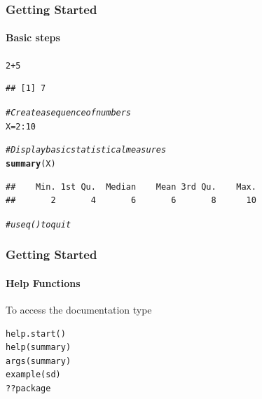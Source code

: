 \documentclass[12pt]{beamer}\usepackage[]{graphicx}\usepackage[]{color}
\makeatletter
\newcommand{\hlnum}[1]{\textcolor[rgb]{0.686,0.059,0.569}{#1}}%
\newcommand{\hlcom}[1]{\textcolor[rgb]{0.678,0.584,0.686}{\textit{#1}}}%
\newcommand{\hlopt}[1]{\textcolor[rgb]{0,0,0}{#1}}%
\newcommand{\hlstd}[1]{\textcolor[rgb]{0.345,0.345,0.345}{#1}}%
\newcommand{\hlkwb}[1]{\textcolor[rgb]{0.69,0.353,0.396}{#1}}%
\newcommand{\hlkwd}[1]{\textcolor[rgb]{0.737,0.353,0.396}{\textbf{#1}}}%
\newenvironment{kframe}{%
 \def\at@end@of@kframe{}%
 \ifinner\ifhmode%
  \def\at@end@of@kframe{\end{minipage}}%
  \begin{minipage}{\columnwidth}%
 \fi\fi%
 \def\FrameCommand##1{\hskip\@totalleftmargin \hskip-\fboxsep
 \colorbox{shadecolor}{##1}\hskip-\fboxsep
     \hskip-\linewidth \hskip-\@totalleftmargin \hskip\columnwidth}%
 \MakeFramed {\advance\hsize-\width
   \@totalleftmargin\z@ \linewidth\hsize
   \@setminipage}}%
 {\par\unskip\endMakeFramed%
 \at@end@of@kframe}
\newenvironment{knitrout}{}{} %
\makeatother
\begin{document}
\begin{frame}[fragile]
  \frametitle{Getting Started}
  \framesubtitle{Basic steps}

\begin{knitrout}
\color{fgcolor}\begin{kframe}
\begin{alltt}
\hlnum{2}\hlopt{+}\hlnum{5}
\end{alltt}
\begin{verbatim}
## [1] 7
\end{verbatim}
\begin{alltt}
\hlcom{# Create a sequence of numbers}
\hlstd{X} \hlkwb{=} \hlnum{2}\hlopt{:}\hlnum{10}

\hlcom{# Display basic statistical measures}
\hlkwd{summary}\hlstd{(X)}
\end{alltt}
\begin{verbatim}
##    Min. 1st Qu.  Median    Mean 3rd Qu.    Max. 
##       2       4       6       6       8      10
\end{verbatim}
\begin{alltt}
\hlcom{# use q() to quit}
\end{alltt}
\end{kframe}
\end{knitrout}
\clearpage
\end{frame}

\begin{frame}[fragile]
  \frametitle{Getting Started}
  \framesubtitle{Help Functions}
\begin{block}{To access the documentation type}
\end{block}
\begin{lstlisting} 
help.start()
help(summary)
args(summary)
example(sd)
??package
\end{lstlisting} 
\clearpage
\end{frame}
\end{document}
